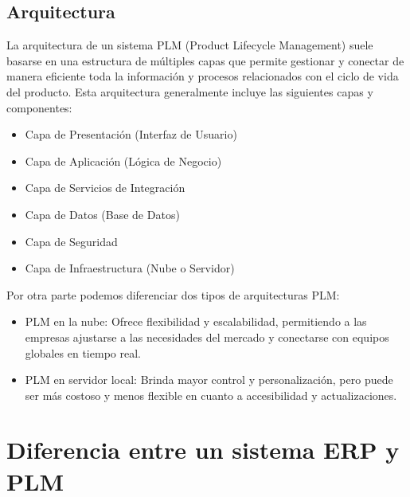 \documentclass[12pt]{article}
\begin{document}
\subsection{Arquitectura}


La arquitectura de un sistema PLM (Product Lifecycle Management) suele basarse en una estructura de múltiples capas que permite gestionar y 
conectar de manera eficiente toda la información y procesos relacionados con el ciclo de vida del producto. Esta arquitectura generalmente 
incluye las siguientes capas y componentes:

\begin{itemize}
    \item Capa de Presentación (Interfaz de Usuario)
    \item Capa de Aplicación (Lógica de Negocio)
    \item Capa de Servicios de Integración
    \item Capa de Datos (Base de Datos)
    \item Capa de Seguridad
    \item Capa de Infraestructura (Nube o Servidor)
\end{itemize}

Por otra parte podemos diferenciar dos tipos de arquitecturas PLM:
\begin{itemize}
    \item PLM en la nube: Ofrece flexibilidad y escalabilidad, permitiendo a las empresas ajustarse a las necesidades del mercado
    y conectarse con equipos globales en tiempo real.
    \item PLM en servidor local: Brinda mayor control y personalización, pero puede ser más costoso y menos flexible en cuanto a 
    accesibilidad y actualizaciones.
\end{itemize}

\section{Diferencia entre un sistema ERP y PLM}
\end{document}
